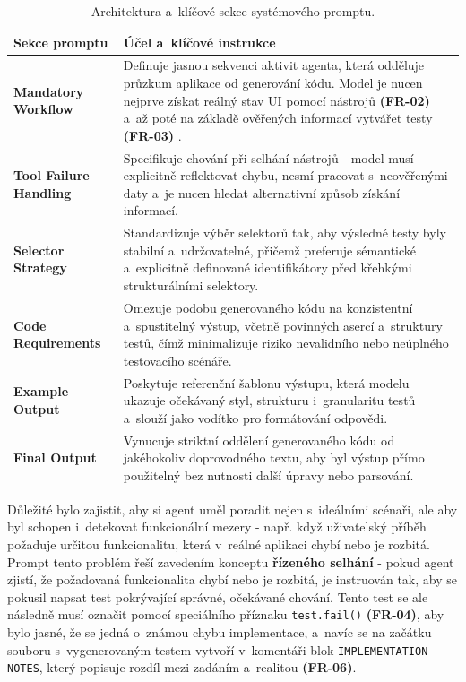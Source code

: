 \documentclass[czech, ing, kiv, he, iso690numb, viewonly]{fasthesis}
\begin{document}
\begin{table}[h]
\centering
\renewcommand{\arraystretch}{1.3}
\begin{tabular}{|l|p{8.5cm}|}
\hline
\textbf{Sekce promptu} & \textbf{Účel a~klíčové instrukce} \\ \hline
\textbf{Mandatory Workflow} & Definuje jasnou sekvenci aktivit agenta, která odděluje průzkum 
aplikace od generování kódu. Model je nucen nejprve získat reálný stav UI pomocí nástrojů \textbf{(FR-02)} a~až poté na základě ověřených informací vytvářet testy \textbf{(FR-03)} . \\ \hline
\textbf{Tool Failure Handling} & Specifikuje chování při selhání nástrojů - model 
musí explicitně reflektovat chybu, nesmí pracovat s~neověřenými daty a~je nucen hledat alternativní způsob získání informací. \\ \hline
\textbf{Selector Strategy} & Standardizuje výběr selektorů tak, aby výsledné testy byly
 stabilní a~udržovatelné, přičemž preferuje sémantické a~explicitně definované identifikátory před křehkými strukturálními selektory. \\ \hline
\textbf{Code Requirements} & Omezuje podobu generovaného kódu na konzistentní a~spustitelný výstup, včetně povinných asercí a~struktury testů, čímž minimalizuje riziko nevalidního nebo neúplného testovacího scénáře. \\ \hline
\textbf{Example Output} & Poskytuje referenční šablonu výstupu, která modelu 
ukazuje očekávaný styl, strukturu i~granularitu testů a~slouží jako vodítko pro formátování odpovědi. \\ \hline
\textbf{Final Output} & Vynucuje striktní oddělení generovaného kódu od jakéhokoliv 
doprovodného textu, aby byl výstup přímo použitelný bez nutnosti další úpravy nebo parsování. \\ \hline
\end{tabular}
\caption{Architektura a~klíčové sekce systémového promptu.}
\label{tab:prompt-structure}
\end{table}

Důležité bylo zajistit, aby si agent uměl poradit nejen s~ideálními scénaři, ale aby byl schopen i~detekovat 
funkcionální mezery - např. když uživatelský příběh požaduje určitou funkcionalitu, která v~reálné aplikaci chybí nebo je rozbitá.
Prompt tento problém řeší zavedením konceptu \textbf{řízeného selhání} - pokud agent zjistí, že 
požadovaná funkcionalita chybí nebo je rozbitá, je instruován tak, aby se pokusil napsat test pokrývající správné, očekávané chování.
Tento test se ale následně musí označit pomocí speciálního příznaku \texttt{test.fail()} \textbf{(FR-04)}, 
aby bylo jasné, že se jedná o~známou chybu implementace, a~navíc se na začátku souboru s~vygenerovaným testem 
vytvoří v~komentáři blok \texttt{IMPLEMENTATION NOTES}, který popisuje rozdíl mezi zadáním a~realitou \textbf{(FR-06)}.
\end{document}

